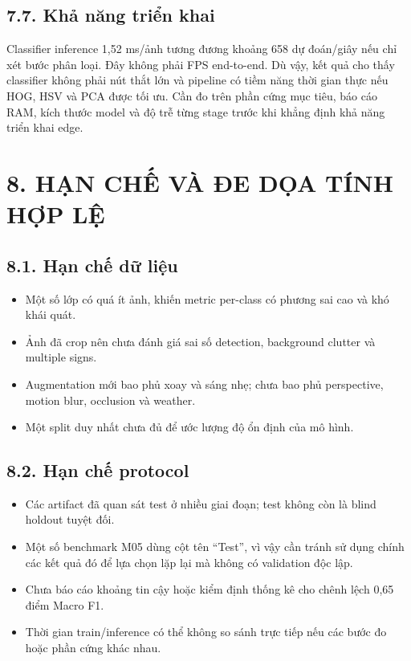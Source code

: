 \documentclass[12pt,a4paper]{article}
\begin{document}
\subsection{7.7. Khả năng triển
khai}\label{khux1ea3-nux103ng-triux1ec3n-khai}

Classifier inference 1,52 ms/ảnh tương đương khoảng 658 dự đoán/giây nếu
chỉ xét bước phân loại. Đây không phải FPS end-to-end. Dù vậy, kết quả
cho thấy classifier không phải nút thắt lớn và pipeline có tiềm năng
thời gian thực nếu HOG, HSV và PCA được tối ưu. Cần đo trên phần cứng
mục tiêu, báo cáo RAM, kích thước model và độ trễ từng stage trước khi
khẳng định khả năng triển khai edge.

\section{8. HẠN CHẾ VÀ ĐE DỌA TÍNH HỢP
LỆ}\label{hux1ea1n-chux1ebf-vuxe0-ux111e-dux1ecda-tuxednh-hux1ee3p-lux1ec7}

\subsection{8.1. Hạn chế dữ
liệu}\label{hux1ea1n-chux1ebf-dux1eef-liux1ec7u}

\begin{itemize}
\item
  Một số lớp có quá ít ảnh, khiến metric per-class có phương sai cao và
  khó khái quát.
\item
  Ảnh đã crop nên chưa đánh giá sai số detection, background clutter và
  multiple signs.
\item
  Augmentation mới bao phủ xoay và sáng nhẹ; chưa bao phủ perspective,
  motion blur, occlusion và weather.
\item
  Một split duy nhất chưa đủ để ước lượng độ ổn định của mô hình.
\end{itemize}

\subsection{8.2. Hạn chế protocol}\label{hux1ea1n-chux1ebf-protocol}

\begin{itemize}
\item
  Các artifact đã quan sát test ở nhiều giai đoạn; test không còn là
  blind holdout tuyệt đối.
\item
  Một số benchmark M05 dùng cột tên ``Test'', vì vậy cần tránh sử dụng
  chính các kết quả đó để lựa chọn lặp lại mà không có validation độc
  lập.
\item
  Chưa báo cáo khoảng tin cậy hoặc kiểm định thống kê cho chênh lệch
  0,65 điểm Macro F1.
\item
  Thời gian train/inference có thể không so sánh trực tiếp nếu các bước
  đo hoặc phần cứng khác nhau.
\end{itemize}
\end{document}
